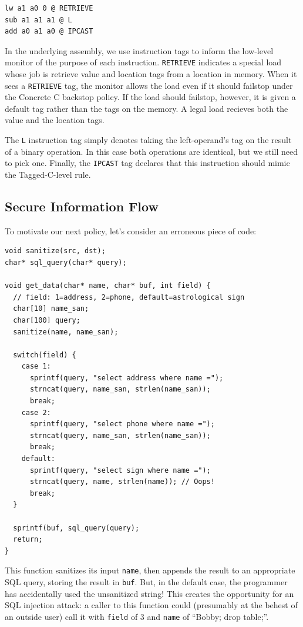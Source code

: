 \documentclass[acmsmall,review,anonymous]{acmart}\settopmatter{printfolios=true,printccs=false,printacmref=false}
\begin{document}
\begin{verbatim}
lw a1 a0 0 @ RETRIEVE
sub a1 a1 a1 @ L
add a0 a1 a0 @ IPCAST
\end{verbatim}

In the underlying assembly, we use instruction tags to inform the low-level monitor
of the purpose of each instruction. {\tt RETRIEVE} indicates a special load
whose job is retrieve value and location tags from a location in memory. When it sees
a {\tt RETRIEVE} tag, the monitor allows the load even if it should failstop under the
Concrete C backstop policy. If the load should failstop, however, it is given a default
tag rather than the tags on the memory. A legal load recieves both the value and the location
tags.

The {\tt L} instruction tag simply denotes taking the left-operand's tag on the result of a
binary operation. In this case both operations are identical, but we still need to pick one.
Finally, the {\tt IPCAST} tag declares that this instruction should mimic the Tagged-C-level
rule.

\subsection{Secure Information Flow}
\label{sec:SIF}

To motivate our next policy, let's consider an erroneous piece of code:

\begin{verbatim}
void sanitize(src, dst);
char* sql_query(char* query);

void get_data(char* name, char* buf, int field) {
  // field: 1=address, 2=phone, default=astrological sign
  char[10] name_san;
  char[100] query;
  sanitize(name, name_san);

  switch(field) {
    case 1:
      sprintf(query, "select address where name =");
      strncat(query, name_san, strlen(name_san));
      break;
    case 2:
      sprintf(query, "select phone where name =");
      strncat(query, name_san, strlen(name_san));
      break;
    default:
      sprintf(query, "select sign where name =");
      strncat(query, name, strlen(name)); // Oops!
      break;
  }

  sprintf(buf, sql_query(query);
  return;
}
\end{verbatim}

This function sanitizes its input {\tt name}, then appends the result to an appropriate SQL
query, storing the result in {\tt buf}. But, in the default case, the programmer has accidentally
used the unsanitized string! This creates the opportunity for an SQL injection attack: a caller
to this function could (presumably at the behest of an outside user) call it with {\tt field} of
3 and {\tt name} of ``Bobby; drop table;''.
\end{document}
